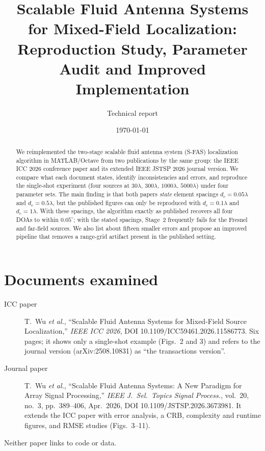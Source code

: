 \documentclass[11pt,a4paper]{article}
\title{Scalable Fluid Antenna Systems for Mixed-Field Localization:\\
Reproduction Study, Parameter Audit and Improved Implementation}
\author{Technical report}
\date{\today}
\newcommand{\dc}{d_c}\newcommand{\de}{d_e}
\begin{document}
\maketitle

\begin{abstract}
We reimplemented the two-stage scalable fluid antenna system (S-FAS) localization algorithm
in MATLAB/Octave from two publications by the same group: the IEEE ICC 2026 conference paper
and its extended IEEE JSTSP 2026 journal version. We compare what each document states, identify
inconsistencies and errors, and reproduce the single-shot experiment (four sources at
$30\lambda$, $300\lambda$, $1000\lambda$, $5000\lambda$) under four parameter sets.
The main finding is that both papers \emph{state} element spacings $\dc=0.05\lambda$ and
$\de=0.5\lambda$, but the published figures can only be reproduced with $\dc=0.1\lambda$ and
$\de=1\lambda$. With these spacings, the algorithm exactly as published recovers all four
DOAs to within $0.05^\circ$; with the stated spacings, Stage~2 frequently fails for the Fresnel
and far-field sources. We also list about fifteen smaller errors and propose an improved
pipeline that removes a range-grid artifact present in the published setting.
\end{abstract}

\tableofcontents

\section{Documents examined}
\begin{description}
\item[ICC paper] T.~Wu \emph{et al.}, ``Scalable Fluid Antenna Systems for Mixed-Field Source
Localization,'' \emph{IEEE ICC 2026}, DOI 10.1109/ICC59461.2026.11586773. Six pages; it shows only
a single-shot example (Figs.~2 and 3) and refers to the journal version (arXiv:2508.10831) as
``the transactions version''.
\item[Journal paper] T.~Wu \emph{et al.}, ``Scalable Fluid Antenna Systems: A New Paradigm for
Array Signal Processing,'' \emph{IEEE J.~Sel.~Topics Signal Process.}, vol.~20, no.~3,
pp.~389--406, Apr.~2026, DOI 10.1109/JSTSP.2026.3673981. It extends the ICC paper with error
analysis, a CRB, complexity and runtime figures, and RMSE studies (Figs.~3--11).
\end{description}
Neither paper links to code or data.
\end{document}
